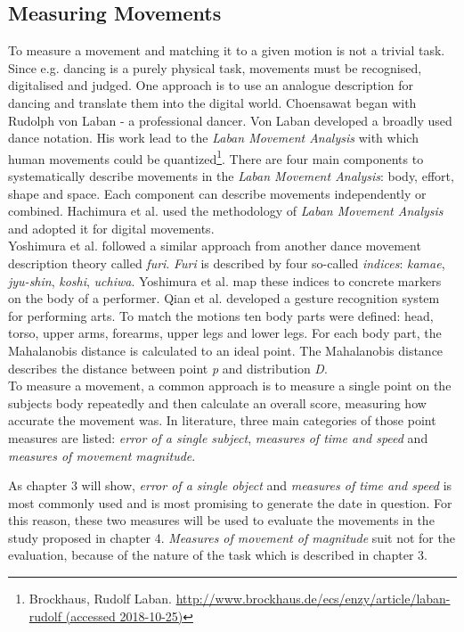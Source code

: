 \subsection{Measuring Movements}
\label{sec:measuringmovements}
To measure a movement and matching it to a given motion is not a trivial task. Since e.g. dancing is a purely physical task, movements must be recognised, digitalised and judged. One approach is to use an analogue description for dancing and translate them into the digital world. Choensawat\cite{Choensawat2015} began with Rudolph von Laban - a professional dancer. Von Laban developed a broadly used dance notation. His work lead to the \textit{Laban Movement Analysis} with which human movements could be quantized\footnote{Brockhaus, Rudolf Laban. \hyperlink{http://www.brockhaus.de/ecs/enzy/article/laban-rudolf}{http://www.brockhaus.de/ecs/enzy/article/laban-rudolf (accessed 2018-10-25)}}. There are four main components to systematically describe movements in the \textit{Laban Movement Analysis}: body, effort, shape and space. Each component can describe movements independently or combined. Hachimura et al. \cite{Hachimura2004} used the methodology of \textit{Laban Movement Analysis} and adopted it for digital movements.\\
Yoshimura et al. \cite{Yoshimura2006} followed a similar approach from another dance movement description theory called \textit{furi}. \textit{Furi} is described by four so-called \textit{indices}: \textit{kamae}, \textit{jyu-shin}, \textit{koshi}, \textit{uchiwa}. Yoshimura et al. map these indices to concrete markers on the body of a performer. Qian et al. \cite{Qian2005} developed a gesture recognition system for performing arts. To match the motions ten body parts were defined: head, torso, upper arms, forearms, upper legs and lower legs. For each body part, the Mahalanobis distance is calculated to an ideal point. The Mahalanobis distance describes the distance between point \textit{p} and distribution \textit{D}.\\
To measure a movement, a common approach is to measure a single point on the subjects body repeatedly and then calculate an overall score, measuring how accurate the movement was. In literature, three main categories of those point measures are listed: \textit{error of a single subject}, \textit{measures of time and speed} and \textit{measures of movement magnitude}.
\begin{tcolorbox}[colback=red!30!white]
As chapter 3 will show, \textit{error of a single object} and \textit{measures of time and speed} is most commonly used and is most promising to generate the date in question. For this reason, these two measures will be used to evaluate the movements in the study proposed in chapter 4. \textit{Measures of movement of magnitude} suit not for the evaluation, because of the nature of the task which is described in chapter 3.
\end{tcolorbox}
